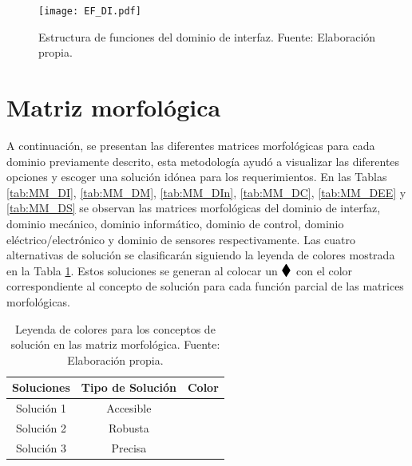 \begin{figure}[H]
	\centering
	\texttt{[image: EF\_DI.pdf]}
	\caption[Estructura de funciones del dominio de interfaz.]{Estructura de funciones del dominio de interfaz. Fuente: Elaboración propia.}
	\label{fig:EF_DI}
\end{figure}

\section{Matriz morfológica}

A continuación, se presentan las diferentes matrices morfológicas para cada dominio previamente descrito, esta metodología ayudó a visualizar las diferentes opciones y escoger una solución idónea para los requerimientos. En las Tablas \ref{tab:MM_DI}, \ref{tab:MM_DM}, \ref{tab:MM_DIn}, \ref{tab:MM_DC}, \ref{tab:MM_DEE} y \ref{tab:MM_DS} se observan las matrices morfológicas del dominio de interfaz, dominio mecánico, dominio informático, dominio de control, dominio eléctrico/electrónico y dominio de sensores respectivamente. 
Las cuatro alternativas de solución se clasificarán siguiendo la leyenda de colores mostrada en la Tabla \ref{tab:leyenda_colores_soluciones}. Estos soluciones se generan al colocar un $\B{\blacklozenge}{1.35}$ con el color correspondiente al concepto de solución para cada función parcial de las matrices morfológicas.

\begin{table}[H]
	\centering
	\caption[Leyenda de colores para los conceptos de solución en las matriz morfológica.]{Leyenda de colores para los conceptos de solución en las matriz morfológica. Fuente: Elaboración propia.}
	\begin{tabular}{|c|c|c|}
		\hline
		\textbf{Soluciones} & \textbf{Tipo de Solución} & \textbf{Color} \bigstrut\\
		\hline
		Solución 1 & Accesible & \cellcolor[rgb]{1,0,0} \bigstrut\\
		\hline
		Solución 2 & Robusta & \cellcolor[rgb]{0,0,1} \bigstrut\\
		\hline
		Solución 3 & Precisa & \cellcolor[rgb]{.298, .835, .078} \bigstrut\\
		\hline
	\end{tabular}%
	\label{tab:leyenda_colores_soluciones}%
\end{table}

